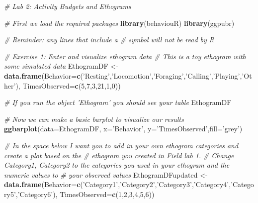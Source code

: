 \documentclass[]{book}
\newenvironment{Shaded}{\begin{snugshade}}{\end{snugshade}}
\newcommand{\CommentTok}[1]{\textcolor[rgb]{0.56,0.35,0.01}{\textit{#1}}}
\newcommand{\DataTypeTok}[1]{\textcolor[rgb]{0.13,0.29,0.53}{#1}}
\newcommand{\DecValTok}[1]{\textcolor[rgb]{0.00,0.00,0.81}{#1}}
\newcommand{\KeywordTok}[1]{\textcolor[rgb]{0.13,0.29,0.53}{\textbf{#1}}}
\newcommand{\NormalTok}[1]{#1}
\newcommand{\StringTok}[1]{\textcolor[rgb]{0.31,0.60,0.02}{#1}}
\begin{document}
\begin{Shaded}
\begin{Highlighting}[]
\CommentTok{# Lab 2:  Activity Budgets and Ethograms}

\CommentTok{# First we load the required packages}
\KeywordTok{library}\NormalTok{(behaviouR)}
\KeywordTok{library}\NormalTok{(ggpubr)}

\CommentTok{# Reminder: any lines that include a # symbol will not be read by R}

\CommentTok{# Exercise 1: Enter and visualize ethogram data}
\CommentTok{# This is a toy ethogram with some simulated data}
\NormalTok{EthogramDF <-}\StringTok{ }\KeywordTok{data.frame}\NormalTok{(}\DataTypeTok{Behavior=}\KeywordTok{c}\NormalTok{(}\StringTok{'Resting'}\NormalTok{,}\StringTok{'Locomotion'}\NormalTok{,}\StringTok{'Foraging'}\NormalTok{,}\StringTok{'Calling'}\NormalTok{,}\StringTok{'Playing'}\NormalTok{,}\StringTok{'Other'}\NormalTok{),}
                         \DataTypeTok{TimesObserved=}\KeywordTok{c}\NormalTok{(}\DecValTok{5}\NormalTok{,}\DecValTok{7}\NormalTok{,}\DecValTok{3}\NormalTok{,}\DecValTok{21}\NormalTok{,}\DecValTok{1}\NormalTok{,}\DecValTok{0}\NormalTok{))}

\CommentTok{# If you run the object 'Ethogram' you should see your table }
\NormalTok{EthogramDF}

\CommentTok{# Now we can make a basic barplot to visualize our results}
\KeywordTok{ggbarplot}\NormalTok{(}\DataTypeTok{data=}\NormalTok{EthogramDF, }\DataTypeTok{x=}\StringTok{'Behavior'}\NormalTok{, }\DataTypeTok{y=}\StringTok{'TimesObserved'}\NormalTok{,}\DataTypeTok{fill=}\StringTok{'grey'}\NormalTok{)}

\CommentTok{# In the space below I want you to add in your own ethogram categories and create a plot based on the }
\CommentTok{# ethogram you created in Field lab 1.}
\CommentTok{# Change Category1, Category2 to the categories you used in your ethogram and the numeric values to }
\CommentTok{# your observed values}
\NormalTok{EthogramDFupdated <-}\StringTok{ }\KeywordTok{data.frame}\NormalTok{(}\DataTypeTok{Behavior=}\KeywordTok{c}\NormalTok{(}\StringTok{'Category1'}\NormalTok{,}\StringTok{'Category2'}\NormalTok{,}\StringTok{'Category3'}\NormalTok{,}\StringTok{'Category4'}\NormalTok{,}\StringTok{'Category5'}\NormalTok{,}\StringTok{'Category6'}\NormalTok{),}
                                \DataTypeTok{TimesObserved=}\KeywordTok{c}\NormalTok{(}\DecValTok{1}\NormalTok{,}\DecValTok{2}\NormalTok{,}\DecValTok{3}\NormalTok{,}\DecValTok{4}\NormalTok{,}\DecValTok{5}\NormalTok{,}\DecValTok{6}\NormalTok{))}


\end{Highlighting}
\end{Shaded}
\end{document}
